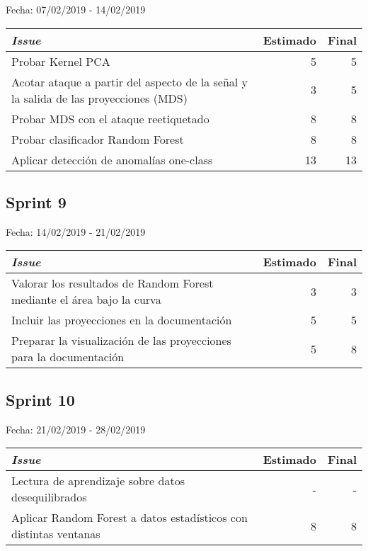 Fecha: 07/02/2019 - 14/02/2019



\begin{table}[h]
	\begin{tabularx}{\textwidth}{|Xrr|}
		\hline \textbf{\textit{Issue}} & \textbf{Estimado} & \textbf{Final}\\
		\hline Probar Kernel PCA & 5 & 5 \\
		\hline Acotar ataque a partir del aspecto de la señal y la salida de las proyecciones (MDS) & 3 & 5 \\
		\hline Probar MDS con el ataque reetiquetado & 8 & 8 \\
		\hline Probar clasificador Random Forest & 8 & 8 \\
		\hline Aplicar detección de anomalías one-class & 13 & 13 \\
		\hline
	\end{tabularx}
\end{table}


\subsection{Sprint 9}

Fecha: 14/02/2019 - 21/02/2019



\begin{table}[h]
	\begin{tabularx}{\textwidth}{|Xrr|}
		\hline \textbf{\textit{Issue}} & \textbf{Estimado} & \textbf{Final}\\
		\hline Valorar los resultados de Random Forest mediante el área bajo la curva & 3 & 3 \\
		\hline Incluir las proyecciones en la documentación & 5 & 5 \\
		\hline Preparar la visualización de las proyecciones para la documentación & 5 & 8 \\
		\hline
	\end{tabularx}
\end{table}

\subsection{Sprint 10}

Fecha: 21/02/2019 - 28/02/2019



\begin{table}[h]
	\begin{tabularx}{\textwidth}{|Xrr|}
		\hline \textbf{\textit{Issue}} & \textbf{Estimado} & \textbf{Final}\\
		\hline Lectura de aprendizaje sobre datos desequilibrados & - & - \\
		\hline Aplicar Random Forest a datos estadísticos con distintas ventanas & 8 & 8 \\
		\hline
	\end{tabularx}
\end{table}

